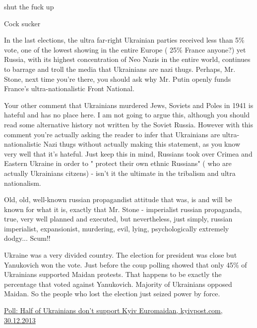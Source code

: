 \begin{itemize}
shut the fuck up

Cock sucker


In the last elections, the ultra far-right Ukrainian parties received less than
5\% vote, one of the lowest showing in the entire Europe ( 25\% France anyone?)
yet Russia, with its highest concentration of Neo Nazis in the entire world,
continues to barrage and troll the media that Ukrainians are nazi thugs.
Perhaps, Mr. Stone, next time you're there, you should ask why Mr. Putin openly
funds France's ultra-nationalistic Front National.



Your other comment that Ukrainians murdered Jews, Soviets and Poles in 1941 is
hateful and has no place here. I am not going to argue this, although you
should read some alternative history not written by the Soviet Russia. However
with this comment you're actually asking the reader to infer that Ukrainians
are ultra-nationalistic Nazi thugs without actually making this statement, as
you know very well that it's hateful. Just keep this in mind, Russians took
over Crimea and Eastern Ukraine in order to " protect their own ethnic
Russians" ( who are actually Ukrainians citzens) - isn't it the ultimate in the
tribalism and ultra nationalism.


Old, old, well-known russian propagandist attitude that was, is and will be
known for what it is, exactly that Mr. Stone - imperialist russian propaganda,
true, very well planned and executed, but nevertheless, just simply, russian
imperialist, expansionist, murdering, evil, lying, psychologically extremely
dodgy... Scum!!



Ukraine was a very divided country. The election for president was close but
Yanukovich won the vote. Just before the coup polling showed that only 45\% of
Ukrainians supported Maidan protests. That happens to be exactly the percentage
that voted against Yanukovich. Majority of Ukrainians opposed Maidan. So the
people who lost the election just seized power by force. 

\href{https://www.kyivpost.com/article/content/ukraine-politics/poll-half-of-ukrainians-dont-support-kyiv-euromaidan-rb-334469.html}{%
Poll: Half of Ukrainians don’t support Kyiv Euromaidan, kyivpost.com, 30.12.2013%
}


\end{itemize}
